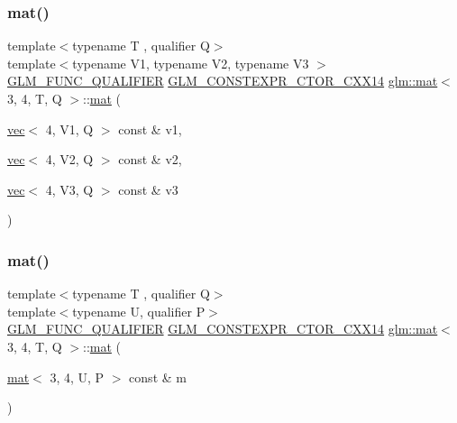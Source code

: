 \subsubsection{\texorpdfstring{mat()}{mat()}\hspace{0.1cm}{\footnotesize\ttfamily [20/21]}}
{\footnotesize\ttfamily template$<$typename T , qualifier Q$>$ \\
template$<$typename V1, typename V2, typename V3 $>$ \\
\hyperlink{setup_8hpp_a33fdea6f91c5f834105f7415e2a64407}{G\+L\+M\+\_\+\+F\+U\+N\+C\+\_\+\+Q\+U\+A\+L\+I\+F\+I\+ER} \hyperlink{setup_8hpp_a0900f9145e68bf6061b6f5e7be3fa751}{G\+L\+M\+\_\+\+C\+O\+N\+S\+T\+E\+X\+P\+R\+\_\+\+C\+T\+O\+R\+\_\+\+C\+X\+X14} \hyperlink{structglm_1_1mat}{glm\+::mat}$<$ 3, 4, T, Q $>$\+::\hyperlink{structglm_1_1mat}{mat} (\begin{DoxyParamCaption}\item[{\hyperlink{structglm_1_1vec}{vec}$<$ 4, V1, Q $>$ const \&}]{v1,  }\item[{\hyperlink{structglm_1_1vec}{vec}$<$ 4, V2, Q $>$ const \&}]{v2,  }\item[{\hyperlink{structglm_1_1vec}{vec}$<$ 4, V3, Q $>$ const \&}]{v3 }\end{DoxyParamCaption})}

\mbox{\label{structglm_1_1mat_3_013_00_014_00_01_t_00_01_q_01_4_a3cecec80a6625a5cccb51d98f04d96a4}} 
\subsubsection{\texorpdfstring{mat()}{mat()}\hspace{0.1cm}{\footnotesize\ttfamily [21/21]}}
{\footnotesize\ttfamily template$<$typename T , qualifier Q$>$ \\
template$<$typename U, qualifier P$>$ \\
\hyperlink{setup_8hpp_a33fdea6f91c5f834105f7415e2a64407}{G\+L\+M\+\_\+\+F\+U\+N\+C\+\_\+\+Q\+U\+A\+L\+I\+F\+I\+ER} \hyperlink{setup_8hpp_a0900f9145e68bf6061b6f5e7be3fa751}{G\+L\+M\+\_\+\+C\+O\+N\+S\+T\+E\+X\+P\+R\+\_\+\+C\+T\+O\+R\+\_\+\+C\+X\+X14} \hyperlink{structglm_1_1mat}{glm\+::mat}$<$ 3, 4, T, Q $>$\+::\hyperlink{structglm_1_1mat}{mat} (\begin{DoxyParamCaption}\item[{\hyperlink{structglm_1_1mat}{mat}$<$ 3, 4, U, P $>$ const \&}]{m }\end{DoxyParamCaption})}



